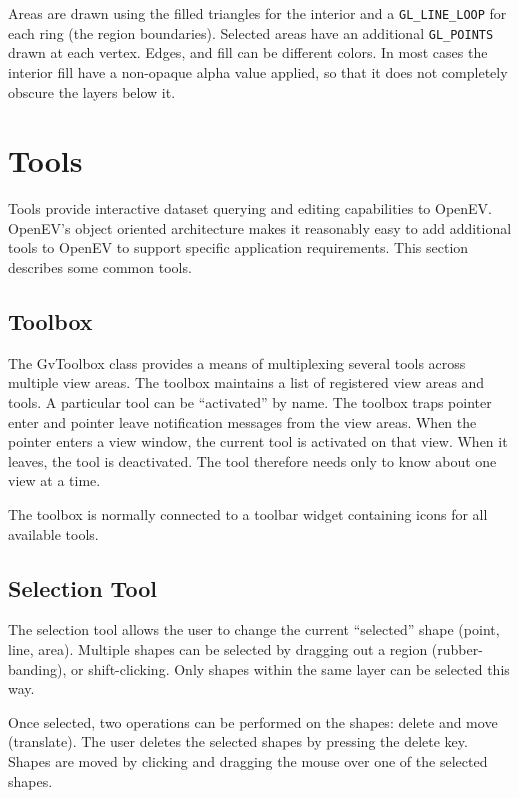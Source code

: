 \documentclass{openevreport}
\begin{document}
Areas are drawn using the filled triangles for the interior and a
\texttt{GL\_LINE\_LOOP} for each ring (the region boundaries).
Selected areas have an additional \texttt{GL\_POINTS} drawn at each
vertex.  Edges, and fill can be different colors.  In most cases
the interior fill have a non-opaque alpha value
applied, so that it does not completely obscure the layers below it.

\chapter{Tools}
\label{sec:tools}

Tools provide interactive dataset querying and editing capabilities to
OpenEV.  OpenEV's object oriented architecture makes it reasonably easy
to add additional tools to OpenEV to support specific application
requirements.  This section describes some common tools.

\section{Toolbox}

The GvToolbox class provides a means of multiplexing several tools
across multiple view areas.  The toolbox maintains a list of
registered view areas and tools.  A particular tool can be
``activated'' by name.  The toolbox traps pointer enter and pointer
leave notification messages from the view areas.  When the pointer
enters a view window, the current tool is activated on that view.  When 
it leaves, the tool is deactivated.  The tool therefore needs only to
know about one view at a time.

The toolbox is normally connected to a toolbar widget containing icons 
for all available tools.

\section{Selection Tool}

The selection tool allows the user to change the current ``selected''
shape (point, line, area).  Multiple shapes can be selected by
dragging out a region (rubber-banding), or shift-clicking.  Only
shapes within the same layer can be selected this way.

Once selected, two operations can be performed on the shapes: delete
and move (translate).  The user deletes the selected shapes by
pressing the delete key.  Shapes are moved by clicking and dragging
the mouse over one of the selected shapes.
\end{document}
